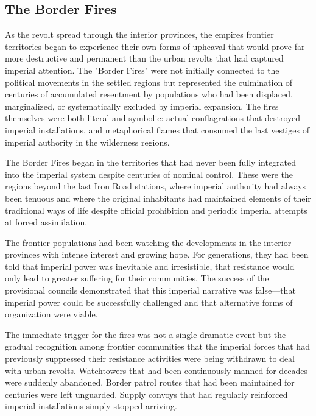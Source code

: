 \subsection{The Border Fires}\label{the-border-fires}

As the revolt spread through the interior provinces, the
empire\textquotesingle s frontier territories began to experience their
own forms of upheaval that would prove far more destructive and
permanent than the urban revolts that had captured imperial attention.
The "Border Fires" were not initially connected to the political
movements in the settled regions but represented the culmination of
centuries of accumulated resentment by populations who had been
displaced, marginalized, or systematically excluded by imperial
expansion. The fires themselves were both literal and symbolic: actual
conflagrations that destroyed imperial installations, and metaphorical
flames that consumed the last vestiges of imperial authority in the
wilderness regions.

The Border Fires began in the territories that had never been fully
integrated into the imperial system despite centuries of nominal
control. These were the regions beyond the last Iron Road stations,
where imperial authority had always been tenuous and where the original
inhabitants had maintained elements of their traditional ways of life
despite official prohibition and periodic imperial attempts at forced
assimilation.

The frontier populations had been watching the developments in the
interior provinces with intense interest and growing hope. For
generations, they had been told that imperial power was inevitable and
irresistible, that resistance would only lead to greater suffering for
their communities. The success of the provisional councils demonstrated
that this imperial narrative was false---that imperial power could be
successfully challenged and that alternative forms of organization were
viable.

The immediate trigger for the fires was not a single dramatic event but
the gradual recognition among frontier communities that the imperial
forces that had previously suppressed their resistance activities were
being withdrawn to deal with urban revolts. Watchtowers that had been
continuously manned for decades were suddenly abandoned. Border patrol
routes that had been maintained for centuries were left unguarded.
Supply convoys that had regularly reinforced imperial installations
simply stopped arriving.


